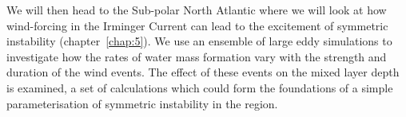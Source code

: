 We will then head to the Sub-polar North Atlantic where we will look at how wind-forcing in the Irminger Current can lead to the excitement of symmetric instability (chapter~\ref{chap:5}). We use an ensemble of large eddy simulations to investigate how the rates of water mass formation vary with the strength and duration of the wind events. The effect of these events on the mixed layer depth is examined, a set of calculations which could form the foundations of a simple parameterisation of symmetric instability in the region.
